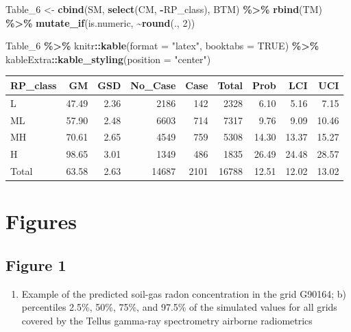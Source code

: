 \documentclass[
  12pt,
]{article}
\newenvironment{Shaded}{\begin{snugshade}}{\end{snugshade}}
\newcommand{\DataTypeTok}[1]{\textcolor[rgb]{0.13,0.29,0.53}{#1}}
\newcommand{\DecValTok}[1]{\textcolor[rgb]{0.00,0.00,0.81}{#1}}
\newcommand{\KeywordTok}[1]{\textcolor[rgb]{0.13,0.29,0.53}{\textbf{#1}}}
\newcommand{\NormalTok}[1]{#1}
\newcommand{\OperatorTok}[1]{\textcolor[rgb]{0.81,0.36,0.00}{\textbf{#1}}}
\newcommand{\OtherTok}[1]{\textcolor[rgb]{0.56,0.35,0.01}{#1}}
\newcommand{\StringTok}[1]{\textcolor[rgb]{0.31,0.60,0.02}{#1}}
\providecommand{\tightlist}{%
  \setlength{\itemsep}{0pt}\setlength{\parskip}{0pt}}
\begin{document}
\begin{Shaded}
\begin{Highlighting}[]
\NormalTok{Table\_}\DecValTok{6}\NormalTok{ \textless{}{-}}\StringTok{ }\KeywordTok{cbind}\NormalTok{(SM, }\KeywordTok{select}\NormalTok{(CM, }\OperatorTok{{-}}\NormalTok{RP\_class), BTM) }\OperatorTok{\%\textgreater{}\%}
\StringTok{    }\KeywordTok{rbind}\NormalTok{(TM) }\OperatorTok{\%\textgreater{}\%}
\StringTok{    }\KeywordTok{mutate\_if}\NormalTok{(is.numeric, }\OperatorTok{\textasciitilde{}}\KeywordTok{round}\NormalTok{(., }\DecValTok{2}\NormalTok{)) }

\NormalTok{Table\_}\DecValTok{6} \OperatorTok{\%\textgreater{}\%}
\StringTok{    }\NormalTok{knitr}\OperatorTok{::}\KeywordTok{kable}\NormalTok{(}\DataTypeTok{format =} \StringTok{"latex"}\NormalTok{, }\DataTypeTok{booktabs =} \OtherTok{TRUE}\NormalTok{) }\OperatorTok{\%\textgreater{}\%}
\StringTok{    }\NormalTok{kableExtra}\OperatorTok{::}\KeywordTok{kable\_styling}\NormalTok{(}\DataTypeTok{position =} \StringTok{"center"}\NormalTok{)}
\end{Highlighting}
\end{Shaded}

\begin{table}[H]
\centering
\begin{tabular}{lrrrrrrrr}
\toprule
RP\_class & GM & GSD & No\_Case & Case & Total & Prob & LCI & UCI\\
\midrule
L & 47.49 & 2.36 & 2186 & 142 & 2328 & 6.10 & 5.16 & 7.15\\
ML & 57.90 & 2.48 & 6603 & 714 & 7317 & 9.76 & 9.09 & 10.46\\
MH & 70.61 & 2.65 & 4549 & 759 & 5308 & 14.30 & 13.37 & 15.27\\
H & 98.65 & 3.01 & 1349 & 486 & 1835 & 26.49 & 24.48 & 28.57\\
Total & 63.58 & 2.63 & 14687 & 2101 & 16788 & 12.51 & 12.02 & 13.02\\
\bottomrule
\end{tabular}
\end{table}

\hypertarget{figures}{%
\section{Figures}\label{figures}}

\hypertarget{figure-1}{%
\subsection{Figure 1}\label{figure-1}}

\begin{enumerate}
\def\labelenumi{\alph{enumi})}
\tightlist
\item
  Example of the predicted soil-gas radon concentration in the grid
  G90164; b) percentiles 2.5\%, 50\%, 75\%, and 97.5\% of the simulated
  values for all grids covered by the Tellus gamma-ray spectrometry
  airborne radiometrics
\end{enumerate}
\end{document}
